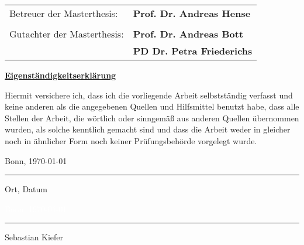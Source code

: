 \thispagestyle{empty}
\thispagestyle{empty}
\begin{center}
\begin{tabular}{ l l }
Betreuer der Masterthesis: & \textbf{Prof. Dr. Andreas Hense} \\
\\
Gutachter der Masterthesis: & \textbf{Prof. Dr. Andreas Bott} \\
& \textbf{PD Dr. Petra Friederichs} \\
\end{tabular}
\end{center}


\vspace*{\fill}
\large{\textbf{\underline{Eigenständigkeitserklärung}}}
\normalsize

\vskip 1cm

\noindent
Hiermit versichere ich, dass ich die vorliegende Arbeit selbstständig verfasst und keine anderen als die angegebenen Quellen und Hilfsmittel benutzt habe, dass alle Stellen der Arbeit, die wörtlich oder sinngemäß aus anderen Quellen übernommen wurden, als solche kenntlich gemacht sind und dass die Arbeit weder in gleicher noch in ähnlicher Form noch keiner Prüfungsbehörde vorgelegt wurde.

\vskip 2cm

\parbox{5.5cm}{\centering Bonn, \today
{\hrule height .5pt}
\strut \centering\footnotesize Ort, Datum} \hfill
\parbox{5.5cm}{\centering \textcolor{white}{\centering Bonn, \today} 
{\hrule height.5pt}
\strut \centering\footnotesize Sebastian Kiefer}
 

